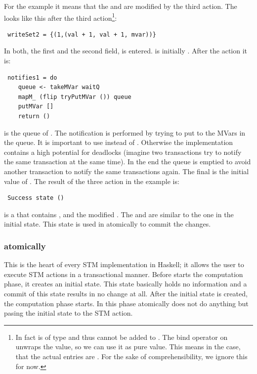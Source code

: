 For the example it means that the  and  are modified by the third 
action. The  looks like this after the third action\footnote{In fact  
is of type  and thus cannot be added to . The bind operator on 
unwraps the value, so we can use it as pure value. This means in the case, that the actual entries are
. For the sake of comprehensibility, we ignore this for now.}:
\begin{lstlisting}
 writeSet2 = {(1,(val + 1, val + 1, mvar))} 
\end{lstlisting}
In both, the first and the second field,  is entered.  is 
initially . After the  action it is:
\begin{lstlisting}
 notifies1 = do
    queue <- takeMVar waitQ
    mapM_ (flip tryPutMVar ()) queue
    putMVar []
    return ()
\end{lstlisting}
 is the queue of . The notification is performed by trying to put \code{()}
to the MVars in the queue. It is important to use  instead of .
Otherwise the implementation contains a high potential for deadlocks (imagine two transactions try to notify the same 
transaction at the same time). In the end the queue is emptied to avoid another transaction to 
notify the same transactions again. The final  is the initial value of 
. The result of the three action in the example is:
\begin{lstlisting}
 Success state ()
\end{lstlisting}
 is a  that contains ,  and the 
modified . The  and  are similar to the one 
in the initial state. This state is used in atomically to commit the changes.


\subsubsection{atomically}
This is the heart of every STM implementation in Haskell; it allows the user to execute STM 
actions in a transactional manner. Before  starts the computation phase, it
creates an initial state. This state basically holds no information and a commit of this state
results in no change at all. After the initial state is created, the computation phase starts. 
In this phase atomically does not do anything but pasing the initial state to the STM action.

